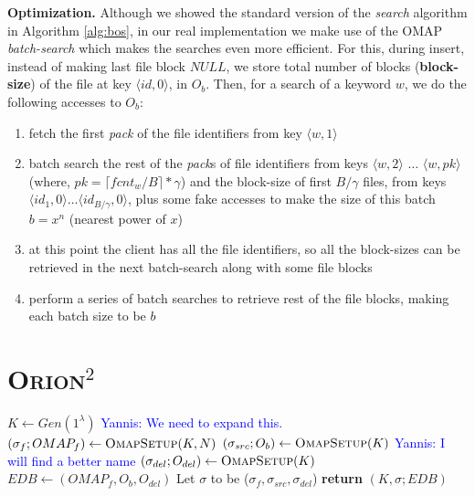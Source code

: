 \documentclass[sigconf]{acmart}
\newcommand{\yannis}[1]{\textcolor{blue}{Yannis: #1}}
\newcommand{\pair}[2]{{\langle \ensuremath{#1, #2} \rangle}}
\newcommand{\ceil}[1]{\lceil #1 \rceil}
\newcommand{\Orionsq}{\textsc{Orion}$^{2}$ }
\begin{document}
\noindent\textbf{Optimization.}
Although we showed the standard version of the \emph{search} algorithm in Algorithm \ref{alg:bos}, in our real implementation we make use of the OMAP \emph{batch-search} which makes the searches even more efficient. For this, during insert, instead of making last file block $NULL$, we store total number of blocks (\textbf{block-size}) of the file at key $\pair{id}{0}$, in $O_{b}$. Then, for a search of a keyword $w$, we do the following accesses to $O_{b}$:
\begin{enumerate}
    \item fetch the first \emph{pack} of the file identifiers from key  $\pair{w}{1}$ 
    \item batch search the rest of the \emph{pack}s of file identifiers from keys $\pair{w}{2}$ $\ldots$ $\pair{w}{pk}$ (where, $pk=\ceil{fcnt_w/B}*\gamma$) and the block-size of first $B/\gamma$ files, from keys $\pair{id_1}{0}$$\ldots$$\pair{id_{B/\gamma}}{0}$, plus some fake accesses to make the size of this batch $b=x^n$ (nearest power of $x$)
    \item at this point the client has all the file identifiers, so all the block-sizes can be retrieved in the next batch-search along with some file blocks
    \item perform a series of batch searches to retrieve rest of the file blocks, making each batch size to be $b$
\end{enumerate}


\section{\Orionsq}

\begin{algorithm}
\caption{\Orionsq $(K,\sigma; EDB) \leftarrow$ Setup($\lambda$,N)}\label{alg:osqsetup}
\begin{algorithmic}[1]
\State $K \gets Gen(1^{\lambda})$ \label{osetalgo:keygen}\yannis{We need to expand this.}
\State $(\sigma_{f}; OMAP_{f}) \leftarrow \textsc{OmapSetup}(K,N)$
\State $(\sigma_{src}; O_{b}) \leftarrow \textsc{OmapSetup}(K)$ \label{osetalgo:omapsrc} \yannis{I will find a better name}
\State $(\sigma_{del}; O_{del}) \leftarrow \textsc{OmapSetup}(K)$ \label{osetalgo:omapdel}
\State $EDB \gets (OMAP_{f}, O_{b}, O_{del})$ \label{bosetalgo:edb}
\State Let $\sigma$ to be ($\sigma_{f}, \sigma_{src},\sigma_{del}$) \label{osetalgo:sigma}
\State \textbf{return} $(K,\sigma; EDB)$
\end{algorithmic}
\label{Algo:orionsqSetup}
\end{algorithm}
\end{document}
